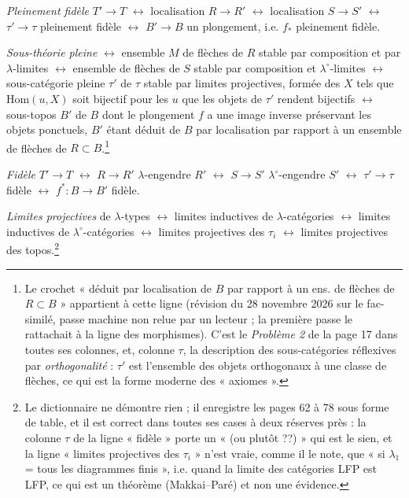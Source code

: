 \documentclass[11pt,a4paper]{article}
\begin{document}
\emph{Pleinement fidèle} $T' \to T$ $\longleftrightarrow$ localisation $R
\to R'$ $\longleftrightarrow$ localisation $S \to S'$ $\longleftrightarrow$
$\tau' \to \tau$ pleinement fidèle $\longleftrightarrow$ $B' \to B$ un
plongement, i.e. $f_{*}$ pleinement fidèle.

\emph{Sous-théorie pleine} $\longleftrightarrow$ ensemble $M$ de flèches de
$R$ stable par composition et par $\lambda$-limites $\longleftrightarrow$
ensemble de flèches de $S$ stable par composition et $\lambda^{\circ}$-limites
$\longleftrightarrow$ sous-catégorie pleine $\tau'$ de $\tau$ stable par
limites projectives, formée des $X$ tels que $\mathrm{Hom}(u, X)$ soit
bijectif pour les $u$ que les objets de $\tau'$ rendent bijectifs
$\longleftrightarrow$ sous-topos $B'$ de $B$ dont le plongement $f$ a une
image inverse préservant les objets ponctuels, $B'$ étant déduit de $B$ par
localisation par rapport à un ensemble de flèches de $R \subset
B$.\footnote{Le crochet « déduit par localisation de $B$ par rapport à un
ens. de flèches de $R \subset B$ » appartient à cette ligne (révision du 28 novembre 2026 sur le fac-similé, passe machine non relue par un lecteur ;
la première passe le rattachait à la ligne des morphismes). C'est le
\emph{Problème 2} de la page 17 dans toutes ses colonnes, et, colonne
$\tau$, la description des sous-catégories réflexives par
\emph{orthogonalité} : $\tau'$ est l'ensemble des objets orthogonaux à
une classe de flèches, ce qui est la forme moderne des « axiomes ».}

\emph{Fidèle} $T' \to T$ $\longleftrightarrow$ $R \to R'$ $\lambda$-engendre
$R'$ $\longleftrightarrow$ $S \to S'$ $\lambda^{\circ}$-engendre $S'$
$\longleftrightarrow$ $\tau' \to \tau$ fidèle $\longleftrightarrow$ $f^{*} :
B \to B'$ fidèle.

\emph{Limites projectives} de $\lambda$-types $\longleftrightarrow$ limites
inductives de $\lambda$-catégories $\longleftrightarrow$ limites inductives
de $\lambda^{\circ}$-catégories $\longleftrightarrow$ limites projectives des
$\tau_{i}$ $\longleftrightarrow$ limites projectives des topos.\footnote{Le
dictionnaire ne démontre rien ; il enregistre les pages 62 à 78 sous forme
de table, et il est correct dans toutes ses cases à deux réserves près :
la colonne $\tau$ de la ligne « fidèle » porte un « (ou plutôt ??) »
qui est le sien, et la ligne « limites projectives des $\tau_{i}$ » n'est
vraie, comme il le note, que « si $\lambda_{1}$ = tous les diagrammes
finis », i.e. quand la limite des catégories LFP est LFP, ce qui est un
théorème (Makkai--Paré) et non une évidence.}
\end{document}

